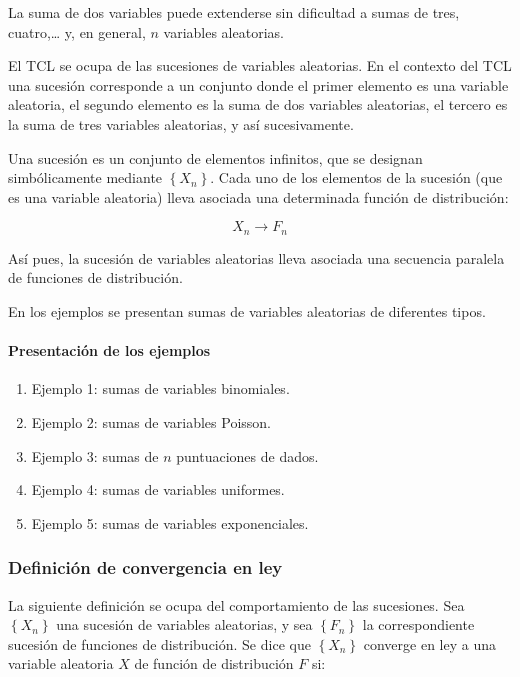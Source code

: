 \documentclass[
]{article}
\providecommand{\tightlist}{%
  \setlength{\itemsep}{0pt}\setlength{\parskip}{0pt}}
\begin{document}
La suma de dos variables puede extenderse sin dificultad a sumas de tres, cuatro,\ldots{} y, en general, \(n\) variables aleatorias.

El TCL se ocupa de las sucesiones de variables aleatorias. En el contexto del TCL una sucesión corresponde a un conjunto donde el primer elemento es una variable aleatoria, el segundo elemento es la suma de dos variables aleatorias, el tercero es la suma de tres variables aleatorias, y así sucesivamente.

Una sucesión es un conjunto de elementos infinitos, que se designan simbólicamente mediante \(\left\{X_{n}\right\}\).
Cada uno de los elementos de la sucesión (que es una variable aleatoria) lleva asociada una determinada función de distribución:

\[
X_{n} \rightarrow F_{n}
\]

Así pues, la sucesión de variables aleatorias lleva asociada una secuencia paralela de funciones de distribución.

En los ejemplos se presentan sumas de variables aleatorias de diferentes tipos.

\paragraph{Presentación de los ejemplos}\label{presentaciuxf3n-de-los-ejemplos}

\begin{enumerate}
\def\labelenumi{\arabic{enumi}.}
\tightlist
\item
  Ejemplo 1: sumas de variables binomiales.
\item
  Ejemplo 2: sumas de variables Poisson.
\item
  Ejemplo 3: sumas de \(n\) puntuaciones de dados.
\item
  Ejemplo 4: sumas de variables uniformes.
\item
  Ejemplo 5: sumas de variables exponenciales.
\end{enumerate}

\subsubsection{Definición de convergencia en ley}\label{definiciuxf3n-de-convergencia-en-ley}

La siguiente definición se ocupa del comportamiento de las sucesiones.
Sea \(\left\{X_{n}\right\}\) una sucesión de variables aleatorias, y sea \(\left\{F_{n}\right\}\) la correspondiente sucesión de funciones de distribución. Se dice que \(\left\{X_{n}\right\}\) converge en ley a una variable aleatoria \(X\) de función de distribución \(F\) si:
\end{document}
